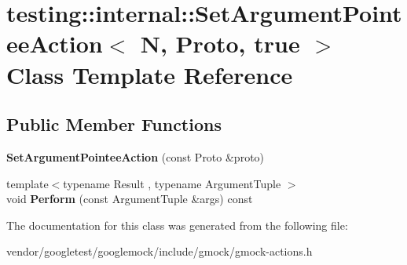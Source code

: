 \hypertarget{classtesting_1_1internal_1_1SetArgumentPointeeAction_3_01N_00_01Proto_00_01true_01_4}{}\section{testing\+:\+:internal\+:\+:Set\+Argument\+Pointee\+Action$<$ N, Proto, true $>$ Class Template Reference}
\label{classtesting_1_1internal_1_1SetArgumentPointeeAction_3_01N_00_01Proto_00_01true_01_4}
\subsection*{Public Member Functions}
\begin{DoxyCompactItemize}
\item 
{\bfseries Set\+Argument\+Pointee\+Action} (const Proto \&proto)\hypertarget{classtesting_1_1internal_1_1SetArgumentPointeeAction_3_01N_00_01Proto_00_01true_01_4_af08b3a61e483f704e93872987d30ade0}{}\label{classtesting_1_1internal_1_1SetArgumentPointeeAction_3_01N_00_01Proto_00_01true_01_4_af08b3a61e483f704e93872987d30ade0}

\item 
{\footnotesize template$<$typename Result , typename Argument\+Tuple $>$ }\\void {\bfseries Perform} (const Argument\+Tuple \&args) const \hypertarget{classtesting_1_1internal_1_1SetArgumentPointeeAction_3_01N_00_01Proto_00_01true_01_4_a77f33bf36443aba70e77d515b162ae24}{}\label{classtesting_1_1internal_1_1SetArgumentPointeeAction_3_01N_00_01Proto_00_01true_01_4_a77f33bf36443aba70e77d515b162ae24}

\end{DoxyCompactItemize}


The documentation for this class was generated from the following file\+:\begin{DoxyCompactItemize}
\item 
vendor/googletest/googlemock/include/gmock/gmock-\/actions.\+h\end{DoxyCompactItemize}
